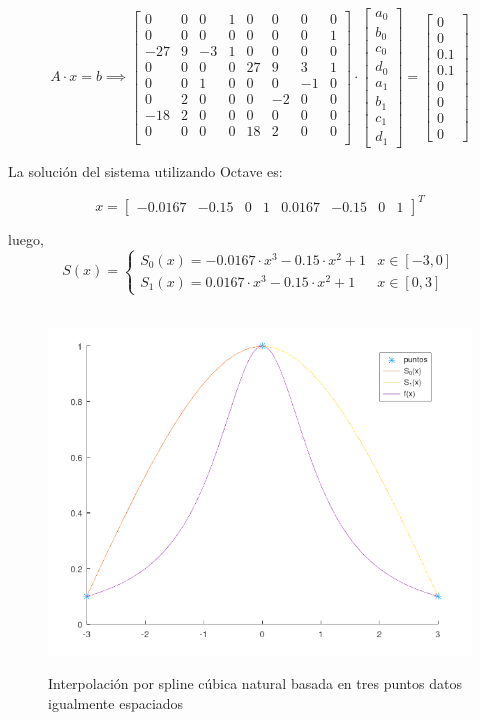 \documentclass{article}
\begin{document}
\[
A \cdot x = b \implies
\begin{bmatrix}
    0 & 0 & 0 & 1 & 0 & 0 & 0 & 0 \\
    0 & 0 & 0 & 0 & 0 & 0 & 0 & 1 \\
    -27 & 9 & -3 & 1 & 0 & 0 & 0 & 0 \\
    0 & 0 & 0 & 0 & 27 & 9 & 3 & 1 \\
    0 & 0 & 1 & 0 & 0 & 0 & -1 & 0 \\
    0 & 2 & 0 & 0 & 0 & -2 & 0 & 0 \\
    -18 & 2 & 0 & 0 & 0 & 0 & 0 & 0 \\
    0 & 0 & 0 & 0 & 18 & 2 & 0 & 0 \\
\end{bmatrix} 
\cdot
\begin{bmatrix}
    a_0 \\ b_0 \\ c_0 \\ d_0 \\ a_1 \\ b_1 \\ c_1 \\ d_1 
\end{bmatrix}
=
\begin{bmatrix}
    0 \\ 0 \\ 0.1 \\ 0.1 \\ 0 \\ 0 \\ 0 \\ 0
\end{bmatrix}
\]

La solución del sistema utilizando Octave es:

\[x = 
\begin{bmatrix}
-0.0167 & -0.15 & 0 & 1 & 0.0167 & -0.15 & 0 & 1 
\end{bmatrix}^T\]

luego,
\[ S(x) = \begin{cases} 
      S_0(x) = -0.0167 \cdot x^3 -0.15 \cdot x^2 + 1 & x \in [-3, 0] \\
      S_1(x) = 0.0167 \cdot x^3 -0.15 \cdot x^2 + 1 & x \in [0, 3]
   \end{cases}
\]\\

\begin{figure}[H]
    \centering
    \includegraphics[width=0.5\linewidth]{Screenshot_20231020_150719.png}
    \label{fig:enter-label}
    \caption{Interpolación por spline cúbica natural basada en tres puntos datos igualmente espaciados}
\end{figure}
\end{document}
